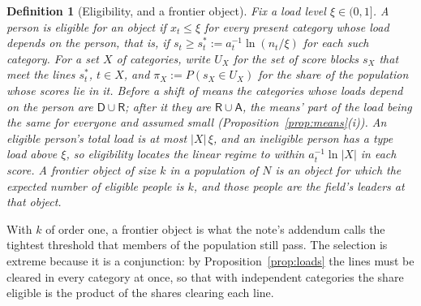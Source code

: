 \documentclass{article}
\newtheorem{definition}{Definition}
\begin{document}
\begin{definition}[Eligibility, and a frontier object]\label{def:eligible}
Fix a load level $\xi \in (0, 1]$. A person is \emph{eligible} for an object if $x_t \leq \xi$ for every present category whose load depends on the person, that is, if $s_t \geq s^{\ast}_t := a_t^{-1}\ln(n_t/\xi)$ for each such category. For a set $X$ of categories, write $U_X$ for the set of score blocks $s_X$ that meet the lines $s^{\ast}_t$, $t \in X$, and $\pi_X := P(s_X \in U_X)$ for the share of the population whose scores lie in it. Before a shift of means the categories whose loads depend on the person are $\mathsf{D} \cup \mathsf{R}$; after it they are $\mathsf{R} \cup \mathsf{A}$, the means' part of the load being the same for everyone and assumed small (Proposition~\ref{prop:means}(i)). An eligible person's total load is at most $|X|\,\xi$, and an ineligible person has a type load above $\xi$, so eligibility locates the linear regime to within $a_t^{-1}\ln|X|$ in each score. A \emph{frontier object} of size $k$ in a population of $N$ is an object for which the expected number of eligible people is $k$, and those people are the field's leaders at that object.
\end{definition}

With $k$ of order one, a frontier object is what the note's addendum calls the tightest threshold that members of the population still pass. The selection is extreme because it is a conjunction: by Proposition~\ref{prop:loads} the lines must be cleared in every category at once, so that with independent categories the share eligible is the product of the shares clearing each line.
\end{document}
